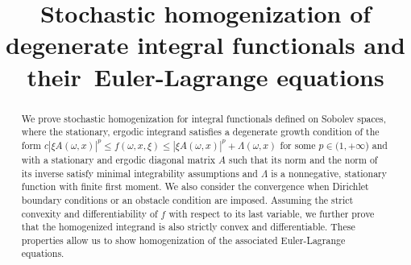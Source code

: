 \documentclass[JEP,XML,SOM,Unicode,published]{cedram}
\theoremstyle{definition}
\begin{document}
\title[Stochastic homogenization of degenerate integral functionals]{Stochastic homogenization of degenerate integral functionals and their~Euler-Lagrange equations}

\author[\initial{M.} \lastname{Ruf}]{ }
\address{Section de mathématiques, École Polytechnique Fédérale de Lausanne\\ Station 8, 1015 Lausanne, Switzerland}

\author[\initial{Th.} \lastname{Ruf}]{ }
\address{Institut für Mathematik, Universität Augsburg\\
86159 Augsburg, Germany}

\begin{abstract}
We prove stochastic homogenization for integral functionals defined on Sobolev spaces, where the stationary, ergodic integrand satisfies a degenerate growth condition of the form $c|\xi A(\omega,x)|^p\leq f(\omega,x,\xi)\leq |\xi A(\omega,x)|^p+\Lambda(\omega,x)$ for some $p\in (1,+\infty$) and with a stationary and ergodic diagonal matrix $A$ such that its norm and the norm of its inverse satisfy minimal integrability assumptions and $\Lambda$ is a nonnegative, stationary function with finite first moment. We also consider the convergence when Dirichlet boundary conditions or an obstacle condition are imposed. Assuming the strict convexity and differentiability of $f$ with respect to its last variable, we further prove that the homogenized integrand is also strictly convex and differentiable. These properties allow us to show homogenization of the associated Euler-Lagrange equations.
\end{abstract}




\end{document}
